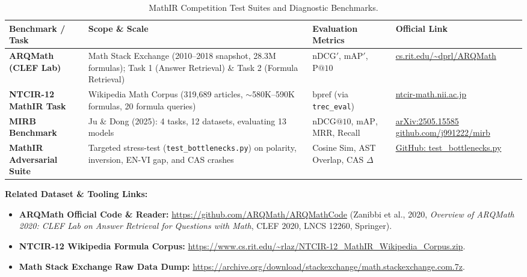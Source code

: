 ﻿\documentclass[11pt,a4paper]{article}
\begin{document}
	\begin{table}[H]
		\centering
		\small
		\caption{MathIR Competition Test Suites and Diagnostic Benchmarks.}
		\label{tab:benchmarks}
		\begin{tabularx}{\textwidth}{p{2.9cm} X p{3.5cm} p{3.8cm}}
			\toprule
			\textbf{Benchmark / Task} & \textbf{Scope \& Scale} & \textbf{Evaluation Metrics} & \textbf{Official Link} \\
			\midrule
			\textbf{ARQMath (CLEF Lab)} & Math Stack Exchange (2010--2018 snapshot, 28.3M formulas); Task 1 (Answer Retrieval) \& Task 2 (Formula Retrieval) & $\text{nDCG}'$, $\text{mAP}'$, $\text{P}@10$ & \href{https://www.cs.rit.edu/~dprl/ARQMath/}{\small cs.rit.edu/\textasciitilde dprl/ARQMath} \\
			\addlinespace[4pt]
			\textbf{NTCIR-12 MathIR Task} & Wikipedia Math Corpus (319,689 articles, $\sim$580K--590K formulas, 20 formula queries) & $\text{bpref}$ (via \texttt{trec\_eval}) & \href{http://ntcir-math.nii.ac.jp/}{\small ntcir-math.nii.ac.jp} \\
			\addlinespace[4pt]
			\textbf{MIRB Benchmark} & Ju \& Dong (2025): 4 tasks, 12 datasets, evaluating 13 models & $\text{nDCG}@10$, $\text{mAP}$, MRR, Recall & \href{https://arxiv.org/abs/2505.15585}{\small arXiv:2505.15585} \newline \href{https://github.com/j991222/mirb}{\small github.com/j991222/mirb} \\
			\addlinespace[4pt]
			\textbf{MathIR Adversarial Suite} & Targeted stress-test (\texttt{test\_bottlenecks.py}) on polarity, inversion, EN-VI gap, and CAS crashes & Cosine Sim, AST Overlap, CAS $\Delta$ & \href{https://github.com/Dvhlong55/MathIR/blob/main/tests/test_bottlenecks.py}{\small GitHub: test\_bottlenecks.py} \\
			\bottomrule
		\end{tabularx}
	\end{table}

	\noindent \textbf{Related Dataset \& Tooling Links:}
	\begin{itemize}
		\item \textbf{ARQMath Official Code \& Reader:} \url{https://github.com/ARQMath/ARQMathCode} (Zanibbi et al., 2020, \textit{Overview of ARQMath 2020: CLEF Lab on Answer Retrieval for Questions with Math}, CLEF 2020, LNCS 12260, Springer).
		\item \textbf{NTCIR-12 Wikipedia Formula Corpus:} \url{https://www.cs.rit.edu/~rlaz/NTCIR-12_MathIR_Wikipedia_Corpus.zip}.
		\item \textbf{Math Stack Exchange Raw Data Dump:} \url{https://archive.org/download/stackexchange/math.stackexchange.com.7z}.
	\end{itemize}
\end{document}
